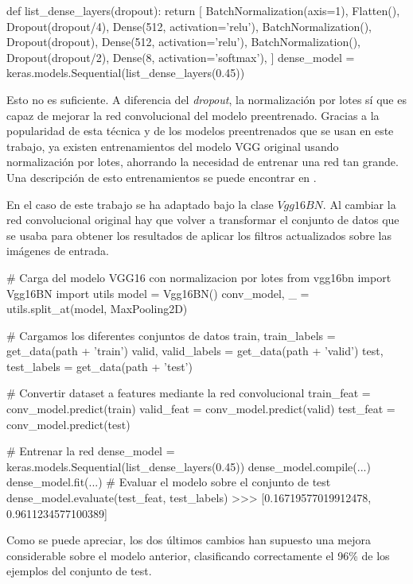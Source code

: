 \begin{python}
def list_dense_layers(dropout):
    return [
        BatchNormalization(axis=1),
        Flatten(),
        Dropout(dropout/4),
        Dense(512, activation='relu'),
        BatchNormalization(),
        Dropout(dropout),
        Dense(512, activation='relu'),
        BatchNormalization(),
        Dropout(dropout/2),
        Dense(8, activation='softmax'),
    ]
dense_model = keras.models.Sequential(list_dense_layers(0.45))
\end{python}

Esto no es suficiente. A diferencia del \textit{dropout}, la normalización por lotes sí que es capaz de mejorar la red convolucional del modelo preentrenado. Gracias a la popularidad de esta técnica y de los modelos preentrenados que se usan en este trabajo, ya existen entrenamientos del modelo VGG original usando normalización por lotes, ahorrando la necesidad de entrenar una red tan grande. Una descripción de esto entrenamientos se puede encontrar en \parencite{pretrained_with_bn}.

En el caso de este trabajo se ha adaptado bajo la clase $Vgg16BN$. Al cambiar la red convolucional original hay que volver a transformar el conjunto de datos que se usaba para obtener los resultados de aplicar los filtros actualizados sobre las imágenes de entrada.

\begin{python}
# Carga del modelo VGG16 con normalizacion por lotes
from vgg16bn import Vgg16BN
import utils
model = Vgg16BN()
conv_model, _ = utils.split_at(model, MaxPooling2D)

# Cargamos los diferentes conjuntos de datos
train, train_labels = get_data(path + 'train')
valid, valid_labels = get_data(path + 'valid')
test, test_labels = get_data(path + 'test')

# Convertir dataset a features mediante la red convolucional
train_feat = conv_model.predict(train)
valid_feat = conv_model.predict(valid)
test_feat = conv_model.predict(test)

# Entrenar la red
dense_model = keras.models.Sequential(list_dense_layers(0.45))
dense_model.compile(...)
dense_model.fit(...)
# Evaluar el modelo sobre el conjunto de test
dense_model.evaluate(test_feat, test_labels)
>>> [0.16719577019912478, 0.9611234577100389]
\end{python}

Como se puede apreciar, los dos últimos cambios han supuesto una mejora considerable sobre el modelo anterior, clasificando correctamente el 96\% de los ejemplos del conjunto de test.

